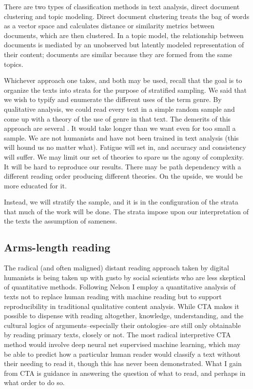 \documentclass[]{book}
\theoremstyle{definition}
\theoremstyle{definition}
\theoremstyle{definition}
\theoremstyle{remark}
\begin{document}
There are two types of classification methods in text analysis, direct
document clustering and topic modeling. Direct document clustering
treats the bag of words as a vector space and calculates distance or
similarity metrics between documents, which are then clustered. In a
topic model, the relationship between documents is mediated by an
unobserved but latently modeled representation of their content;
documents are similar because they are formed from the same topics.

Whichever approach one takes, and both may be used, recall that the goal
is to organize the texts into strata for the purpose of stratified
sampling. We said that we wish to typify and enumerate the different
uses of the term genre. By qualitative analysis, we could read every
text in a simple random sample and come up with a theory of the use of
genre in that text. The demerits of this approach are several
\citep[c.f.][5]{Nelson2017Computational}. It would take longer than we
want even for too small a sample. We are not humanists and have not been
trained in text analysis (this will hound us no matter what). Fatigue
will set in, and accuracy and consistency will suffer. We may limit our
set of theories to spare us the agony of complexity. It will be hard to
reproduce our results. There may be path dependency with a different
reading order producing different theories. On the upside, we would be
more educated for it.

Instead, we will stratify the sample, and it is in the configuration of
the strata that much of the work will be done. The strata impose upon
our interpretation of the texts the assumption of sameness.

\hypertarget{arms-length-reading}{%
\subsection{Arms-length reading}\label{arms-length-reading}}

The radical (and often maligned) distant reading approach taken by
digital humanists is being taken up with gusto by social scientists who
are less skeptical of quantitative methods. Following Nelson
\citeyearpar{Nelson2017Computational} I employ a quantitative analysis
of texts not to replace human reading with machine reading but to
support reproducibility in traditional qualitative content analysis.
While CTA makes it possible to dispense with reading altogether,
knowledge, understanding, and the cultural logics of
arguments--especially their ontologies--are still only obtainable by
reading primary texts, closely or not. The most radical interpretive CTA
method would involve deep neural net supervised machine learning, which
may be able to predict how a particular human reader would classify a
text without their needing to read it, though this has never been
demonstrated. What I gain from CTA is guidance in answering the question
of what to read, and perhaps in what order to do so.
\end{document}
